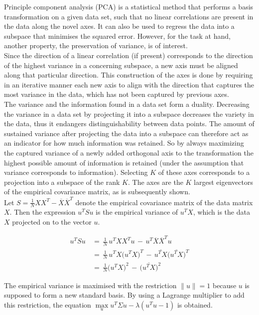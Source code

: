 \documentclass[a4paper, 11pt]{article}
\begin{document}
Principle component analysis (PCA) is a statistical method that performs a basis transformation on a given data set, such that no linear correlations are present in the data along the novel axes. It can also be used to regress the data into a subspace that minimises the squared error. However, for the task at hand, another property, the preservation of variance, is of interest.\\
Since the direction of a linear correlation (if present) corresponds to the direction of the highest variance in a concerning subspace, a new axis must be aligned along that particular direction. This construction of the axes is done by requiring in an iterative manner each new axis to align with the direction that captures the most variance in the data, which has not been captured by previous axes.\\
The variance and the information found in a data set form a duality. Decreasing the variance in a data set by projecting it into a subspace decreases the variety in the data, thus it endangers distinguishability between data points. The amount of sustained variance after projecting the data into a subspace can therefore act as an indicator for how much information was retained. So by always maximizing the captured variance of a newly added orthogonal axis to the transformation the highest possible amount of information is retained  (under the assumption that variance corresponds to information). Selecting $K$ of these axes corresponds to a projection into a subspace of the rank $K$. The axes are the $K$ largest eigenvectors of the empirical covariance matrix, as is subsequently shown. 
\\
Let $S = \frac{1}{N}XX^T - \overline{X} \overline{X}^T$ denote the empirical covariance matrix of the data matrix $X$. Then the expression $u^TSu$ is the empirical variance of $u^TX$, which is the data $X$ projected on to the vector $u$.

\begin{align*}
u^T S u\, & =\, \frac{1}{N}\, u^T X X^T u\, -\, u^T \overline{X} \overline{X}^T u \\
& =\, \frac{1}{N}\, u^T X \big(u^T X\big)^T\,  -\,  \overline{u^TX} \big(\overline{u^TX}\big)^T  \\
& =\, \frac{1}{N} \big(u^T X\big)^2\, -\, \big(\overline{u^TX}\big)^2
\end{align*}

The empirical variance is maximised with the restriction $\parallel u \parallel = 1$ because $u$ is supposed to form a new standard basis. By using a Lagrange multiplier to add this restriction, the equation $\max\limits_{u} u^T \Sigma u - \lambda(u^T u - 1)$ is obtained.
\end{document}
